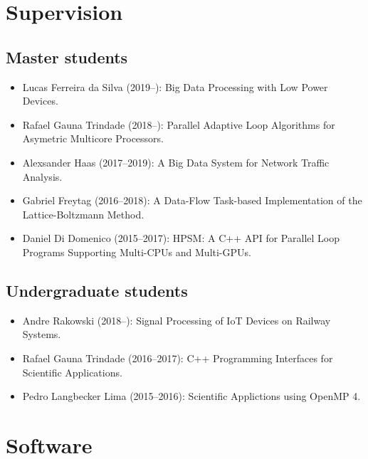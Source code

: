 \documentclass[11pt,a4paper]{article}
\begin{document}
\section{Supervision}

\subsection{Master students}

\begin{itemize} \itemsep -2pt
\item Lucas Ferreira da Silva (2019--): Big Data Processing with Low Power Devices.
\item Rafael Gauna Trindade (2018--): Parallel Adaptive Loop Algorithms for Asymetric Multicore Processors.
\item Alexsander Haas (2017--2019): A Big Data System for Network Traffic Analysis.
\item Gabriel Freytag (2016--2018): A Data-Flow Task-based Implementation of the 
Lattice-Boltzmann Method.
\item Daniel Di Domenico (2015--2017): HPSM: A C++ API for Parallel Loop Programs Supporting Multi-CPUs and Multi-GPUs.
\end{itemize}

\subsection{Undergraduate students}
\begin{itemize} \itemsep -2pt
\item Andre Rakowski (2018--): Signal Processing of IoT Devices on Railway Systems.
\item Rafael Gauna Trindade (2016--2017): C++ Programming Interfaces for
  Scientific Applications.
\item Pedro Langbecker Lima (2015--2016): Scientific Applictions using
  OpenMP 4.
\end{itemize}

\section{Software}
\end{document}
